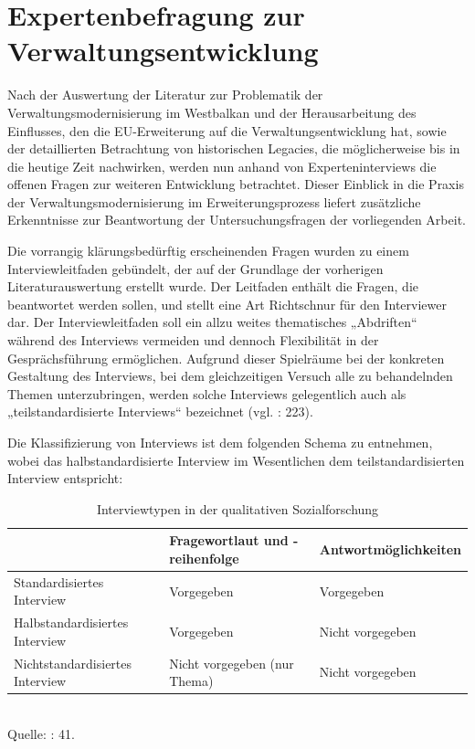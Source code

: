 \chapter{Expertenbefragung zur Verwaltungsentwicklung}
Nach der Auswertung der Literatur zur Problematik der Verwaltungsmodernisierung im Westbalkan und der Herausarbeitung des Einflusses, den die EU-Erweiterung auf die Verwaltungsentwicklung hat, sowie der detaillierten Betrachtung von historischen Legacies, die möglicherweise bis in die heutige Zeit nachwirken, werden nun anhand von Experteninterviews die offenen Fragen zur weiteren Entwicklung betrachtet. Dieser Einblick in die Praxis der Verwaltungsmodernisierung im Erweiterungsprozess liefert zusätzliche Erkenntnisse zur Beantwortung der Untersuchungsfragen der vorliegenden Arbeit.\par
Die vorrangig klärungsbedürftig erscheinenden Fragen wurden zu einem Interviewleitfaden gebündelt, der auf der Grundlage der vorherigen Literaturauswertung erstellt wurde. Der Leitfaden enthält die Fragen, die beantwortet werden sollen, und stellt eine Art Richtschnur für den Interviewer dar. Der Interviewleitfaden soll ein allzu weites thematisches „Abdriften“ während des Interviews vermeiden und dennoch Flexibilität in der Gesprächsführung ermöglichen. Aufgrund dieser Spielräume bei der konkreten Gestaltung des Interviews, bei dem gleichzeitigen Versuch alle zu behandelnden Themen unterzubringen, werden solche Interviews gelegentlich auch als „teilstandardisierte Interviews“ bezeichnet (vgl. \cite{flick10}: 223).\par
Die Klassifizierung von Interviews ist dem folgenden Schema zu entnehmen, wobei das halbstandardisierte Interview im Wesentlichen dem teilstandardisierten Interview entspricht:

\begin{table}[H]
\caption[Interviewtypen in der qualitativen Sozialforschung]{Interviewtypen in der qualitativen Sozialforschung}
\center
\scriptsize{
\begin{tabular}{|L{40mm}|L{40mm}|L{40mm}|}\hline
&Fragewortlaut und -reihenfolge&Antwortmöglichkeiten\\\hline
Standardisiertes Interview&
Vorgegeben&
Vorgegeben\\\hline
Halbstandardisiertes Interview&
Vorgegeben&
Nicht vorgegeben\\\hline
Nichtstandardisiertes Interview&
Nicht vorgegeben (nur Thema)&
Nicht vorgegeben\\\hline
\end{tabular}\\
\vspace{0,5cm}
Quelle: \cite{glalau10}: 41. 
}
\end{table}
 
